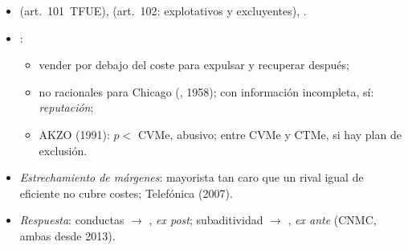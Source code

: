 \documentclass{article}
\begin{document}
\begin{columnas}
\begin{itemize}
\item {} (art.~101~TFUE),  (art.~102: explotativos y excluyentes), .
\item {}:
  \begin{itemize}
  \item vender por debajo del coste para expulsar y recuperar después;
  \item no racionales para Chicago (, 1958); con información incompleta, sí: \emph{reputación};
  \item AKZO (1991): $p<$ CVMe, abusivo; entre CVMe y CTMe, si hay plan de exclusión.
  \end{itemize}
\item \emph{Estrechamiento de márgenes}: mayorista tan caro que un rival igual de eficiente no cubre costes; Telefónica (2007).
\end{itemize}
\begin{itemize}
\item \emph{Respuesta}: conductas $\to$ , \emph{ex post}; subaditividad $\to$ , \emph{ex ante} (CNMC, ambas desde 2013).
\end{itemize}


\end{columnas}
\end{document}
